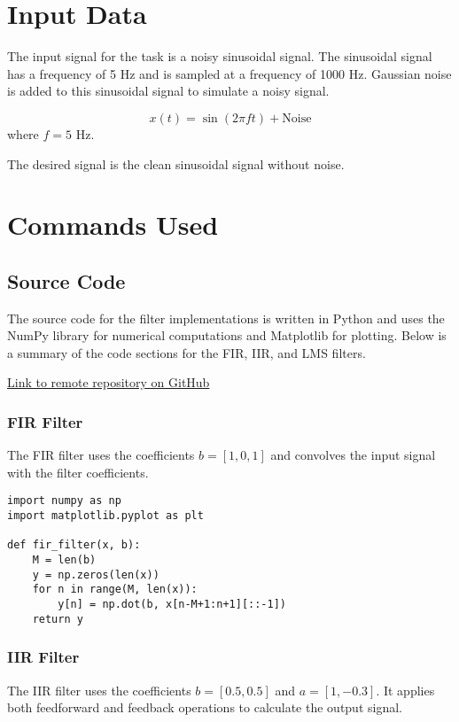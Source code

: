 \documentclass[a4paper,12pt]{article}
\begin{document}
\section{Input Data}
The input signal for the task is a noisy sinusoidal signal. The sinusoidal signal has a frequency of 5 Hz and is sampled at a frequency of 1000 Hz. Gaussian noise is added to this sinusoidal signal to simulate a noisy signal.

\[
x(t) = \sin(2 \pi f t) + \text{Noise}
\]
where \( f = 5 \) Hz.

The desired signal is the clean sinusoidal signal without noise.

\section{Commands Used}
\subsection{Source Code}

The source code for the filter implementations is written in Python and uses the NumPy library for numerical computations and Matplotlib for plotting. Below is a summary of the code sections for the FIR, IIR, and LMS filters.
\item
\href{https://github.com/DariaKrecichwostQA/StudiaUBB/tree/main/Digital%20Signal%20Processing/Zad3}{{Link to remote repository on GitHub}}
\subsubsection{FIR Filter}

The FIR filter uses the coefficients \( b = [1, 0, 1] \) and convolves the input signal with the filter coefficients.

\begin{verbatim}
import numpy as np
import matplotlib.pyplot as plt

def fir_filter(x, b):
    M = len(b)
    y = np.zeros(len(x))
    for n in range(M, len(x)):
        y[n] = np.dot(b, x[n-M+1:n+1][::-1])
    return y
\end{verbatim}

\subsubsection{IIR Filter}

The IIR filter uses the coefficients \( b = [0.5, 0.5] \) and \( a = [1, -0.3] \). It applies both feedforward and feedback operations to calculate the output signal.
\end{document}

